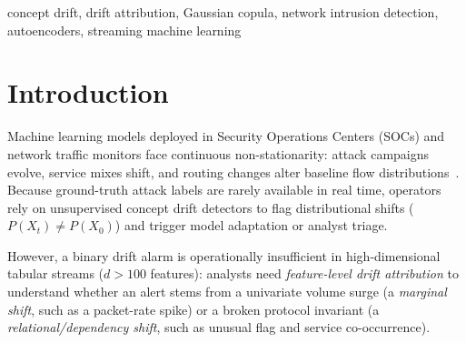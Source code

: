 \documentclass[10pt,conference]{IEEEtran}
\begin{document}
\begin{abstract}
heavy-tailed and recorded-traffic pools, the decomposed hybrid reports drift on
8.6--59.0\% of windows and the relational pathway alone on 4.8--59.0\% in which
nothing has changed, against a nominal 5\%.
Replacing the null with a pooled-label permutation null (family-wise
max-statistic $p$-values, with $\alpha$ split between the two families, which
assumes exchangeable rows within a window --- measured to matter: on raw
capture order the same null rejects in 88.7\% of no-change draws, and block
permutations reduce that only to 41.3\% at 50-row blocks) returns the rate to
3.2--5.8\%, and a greedy
edge-peeling order recovers the features
that carry a permuted-pair change on recorded traffic ($65.0\%\to95.0\%$ Recall@3),
which calibration alone does not --- at the cost of detection power on tied and
heavy-tailed pools, where the calibrated test rarely fires. The
streaming detector fixes post-drift warm-up blindness and buffer
desynchronization and reports 100.0 $\pm$ 0.0\% precision and
97.9 $\pm$ 1.9\% F1 (\texttt{verified\_only}) on a 5-seed NSL-KDD stream, an
evaluation we describe as coarse rather than conclusive: it contains five
negative chunks and a single small novel class.
Source code and provenance-verified benchmarks are available at
\url{https://github.com/Venkateswara-Sahu/OWADD}.
\end{abstract}

\begin{IEEEkeywords}
concept drift, drift attribution, Gaussian copula, network intrusion detection,
autoencoders, streaming machine learning
\end{IEEEkeywords}

\section{Introduction}

Machine learning models deployed in Security Operations Centers (SOCs) and
network traffic monitors face continuous non-stationarity: attack campaigns
evolve, service mixes shift, and routing changes alter baseline flow
distributions~\cite{gama2014survey}. Because ground-truth attack labels are
rarely available in real time, operators rely on unsupervised concept drift
detectors to flag distributional shifts ($P(X_t) \neq P(X_0)$) and trigger
model adaptation or analyst triage.

However, a binary drift alarm is operationally insufficient in high-dimensional
tabular streams ($d > 100$ features): analysts need \emph{feature-level drift
attribution} to understand whether an alert stems from a univariate volume
surge (a \emph{marginal shift}, such as a packet-rate spike) or a broken
protocol invariant (a \emph{relational/dependency shift}, such as unusual flag
and service co-occurrence).
\end{document}
